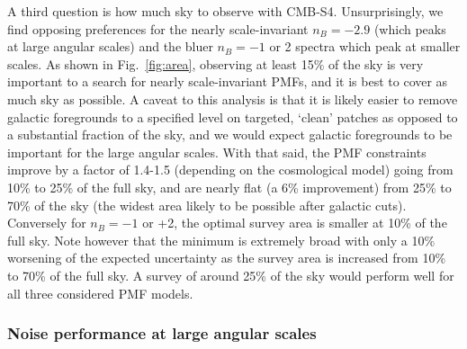 \documentclass[apj]{emulateapj}
\begin{document}
A third question is how much sky to observe with CMB-S4. 
Unsurprisingly, we find opposing preferences for the nearly scale-invariant $n_B=-2.9$ (which peaks at large angular scales) and the bluer $n_B=-1$ or 2 spectra which peak at smaller scales. 
As shown in  Fig.~\ref{fig:area}, observing at least 15\% of the sky is very important to a search for nearly scale-invariant PMFs, and it is best  to cover as much sky as possible. 
A caveat to this analysis is that it is likely easier to remove galactic foregrounds to a specified level on targeted, `clean' patches as opposed to a substantial fraction of the sky, and we would expect galactic foregrounds to be important for the large angular scales. 
With that said, the PMF constraints improve by a factor of 1.4-1.5 (depending on the cosmological model) going from 10\% to 25\% of the full sky, and are nearly flat (a 6\% improvement) from 25\% to 70\% of the sky (the widest area likely to be possible after galactic cuts).
Conversely for $n_B=-1$ or +2, the optimal survey area is smaller at 10\% of the full sky. 
Note however that the minimum is extremely broad with only a 10\% worsening of the expected uncertainty as the survey area is increased from 10\% to 70\% of the  full sky. 
A survey of around 25\% of the sky would perform well for all three considered PMF models. 

\subsubsection{Noise performance at large angular scales}
\end{document}
